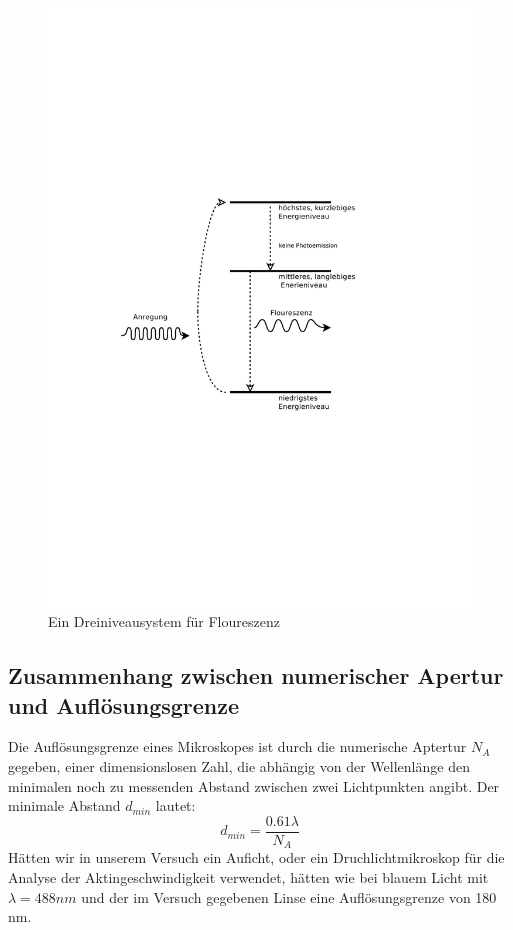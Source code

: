 \begin{figure}[]
  \centering
  \includegraphics[width=\textwidth]{bilder/energieniveauschema.pdf}
  \caption{Ein Dreiniveausystem für Floureszenz}
  \label{fig:dreiniveausystem}
\end{figure}

\subsection{Zusammenhang zwischen numerischer Apertur und Auflösungsgrenze}
Die Auflösungsgrenze eines Mikroskopes ist durch die numerische Aptertur $N_{A}$ gegeben,
einer dimensionslosen Zahl, die abhängig von der Wellenlänge den minimalen noch zu messenden
Abstand zwischen zwei Lichtpunkten angibt. Der minimale Abstand $d_{min}$ lautet:
\begin{equation}
  d_{min} = \frac{0.61 \lambda}{N_{A}}
\end{equation}
Hätten wir in unserem Versuch ein Auficht, oder ein Druchlichtmikroskop
für die Analyse der Aktingeschwindigkeit verwendet, hätten wie bei blauem
Licht mit $ \lambda = 488nm$ und der im Versuch gegebenen Linse eine
Auflösungsgrenze von 180 nm.

